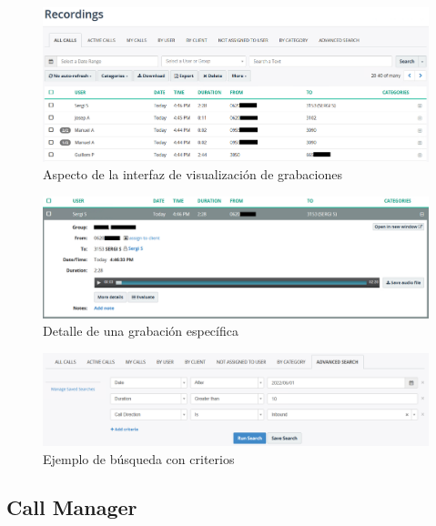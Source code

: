 \documentclass[a4paper, 12pt]{book}
\begin{document}
\begin{figure}
  \centering
  \includegraphics[scale=0.65]{img/fig_grabaciones}
  \caption{Aspecto de la interfaz de visualización de grabaciones}
  \label{figura:fig_grabaciones}
\end{figure}

\begin{figure}
  \centering
  \includegraphics[scale=0.65]{img/fig_grabaciones_02}
  \caption{Detalle de una grabación específica}
  \label{figura:fig_grabaciones_02}
\end{figure}

\begin{figure}
  \centering
  \includegraphics[scale=0.65]{img/fig_filtros}
  \caption{Ejemplo de búsqueda con criterios}
  \label{figura:fig_filtros}
\end{figure}


\subsection{Call Manager}
\label{sec:call_manager}
\end{document}
